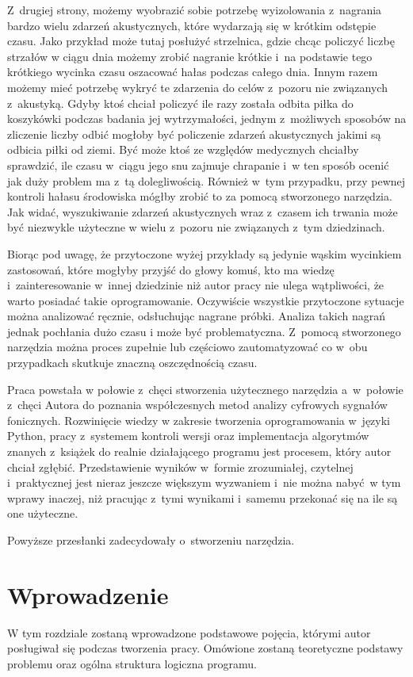 \documentclass[eng,printmode]{mgr}
\begin{document}
Z~drugiej strony, możemy wyobrazić sobie potrzebę wyizolowania z~nagrania bardzo wielu zdarzeń akustycznych, które wydarzają się w krótkim odstępie czasu. Jako przykład może tutaj posłużyć strzelnica, gdzie chcąc policzyć liczbę strzałów w ciągu dnia możemy zrobić nagranie krótkie i~na podstawie tego krótkiego wycinka czasu oszacować hałas podczas całego dnia. Innym razem możemy mieć potrzebę wykryć te zdarzenia do celów z~pozoru nie związanych z~akustyką. Gdyby ktoś chciał policzyć ile razy została odbita piłka do koszykówki podczas badania jej wytrzymałości, jednym z~możliwych sposobów na zliczenie liczby odbić mogłoby być policzenie zdarzeń akustycznych jakimi są odbicia piłki od ziemi. Być może ktoś ze względów medycznych chciałby sprawdzić, ile czasu w~ciągu jego snu zajmuje chrapanie i~w ten sposób ocenić jak duży problem ma z~tą dolegliwością. Również w~tym przypadku, przy pewnej kontroli hałasu środowiska mógłby zrobić to za pomocą stworzonego narzędzia. Jak widać, wyszukiwanie zdarzeń akustycznych wraz z~czasem ich trwania może być niezwykle użyteczne w wielu z~pozoru nie związanych z~tym dziedzinach. 

Biorąc pod uwagę, że przytoczone wyżej przykłady są jedynie wąskim wycinkiem zastosowań, które mogłyby przyjść do głowy komuś, kto ma wiedzę i~zainteresowanie w~innej dziedzinie niż autor pracy nie ulega wątpliwości, że warto posiadać takie oprogramowanie. Oczywiście wszystkie przytoczone sytuacje można analizować ręcznie, odsłuchując nagrane próbki. Analiza takich nagrań jednak pochłania dużo czasu i może być problematyczna. Z~pomocą stworzonego narzędzia można proces zupełnie lub częściowo zautomatyzować co w~obu przypadkach skutkuje znaczną oszczędnością czasu. 

Praca powstała w połowie z~chęci stworzenia użytecznego narzędzia a~w~połowie z~chęci Autora do poznania współczesnych metod analizy cyfrowych sygnałów fonicznych. Rozwinięcie wiedzy w zakresie tworzenia oprogramowania w~języki Python, pracy z~systemem kontroli wersji oraz implementacja algorytmów znanych z~książek do realnie działającego programu jest procesem, który autor chciał zgłębić. Przedstawienie wyników w~formie zrozumiałej, czytelnej i~praktycznej jest nieraz jeszcze większym wyzwaniem i~nie można nabyć~w tym wprawy inaczej, niż pracując z~tymi wynikami i~samemu przekonać się na ile są one użyteczne.

Powyższe przesłanki zadecydowały o~stworzeniu narzędzia. 

\chapter{Wprowadzenie} \label{wprowadzenie}
W tym rozdziale zostaną wprowadzone podstawowe pojęcia, którymi autor posługiwał się podczas tworzenia pracy. Omówione zostaną teoretyczne podstawy problemu oraz ogólna struktura logiczna programu.
\end{document}
